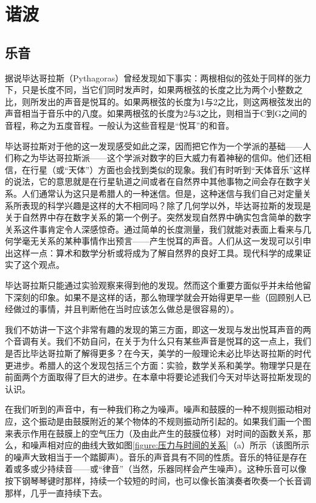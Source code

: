 \chapter{谐波}

\section{乐音}

据说毕达哥拉斯（Pythagoras）曾经发现如下事实：两根相似的弦处于同样的张力下，只是长度不同，当它们同时发声时，如果两根弦的长度之比为两个小整数之比，则所发出的声音是悦耳的。如果两根弦的长度为1与2之比，则这两根弦发出的声音相当于音乐中的八度。如果两根弦的长度为2与3之比，则相当于C到G之间的音程，称之为五度音程。一般认为这些音程是“悦耳”的和音。

毕达哥拉斯对于他的这一发现感受如此之深，因而把它作为一个学派的基础——人们称之为毕达哥拉斯派——这个学派对数字的巨大威力有着神秘的信仰。他们还相信，在行星（或“天体”）方面也会找到类似的现象。我们有时听到“天体音乐”这样的说法，它的意思就是在行星轨道之间或者在自然界中其他事物之间会存在数字关系。人们通常认为这只是希腊人的一种迷信。但是，这种迷信与我们自己对定量关系所表现的科学兴趣是这样的大不相同吗？除了几何学以外，毕达哥拉斯的发现是关于自然界中存在数字关系的第一个例子。突然发现自然界中确实包含简单的数字关系这件事肯定令人深感惊奇。通过简单的长度测量，我们就能对表面上看来与几何学毫无关系的某种事情作出预言——产生悦耳的声音。人们从这一发现可以引申出这样一点：算术和数学分析或将成为了解自然界的良好工具。现代科学的成果证实了这个观点。

毕达哥拉斯只能通过实验观察来得到他的发现。然而这个重要方面似乎并未给他留下深刻的印象。如果不是这样的话，那么物理学就会开始得更早一些（回顾别人已经做过的事情，并且判断他在当时应该怎么做总是很容易的）。

我们不妨讲一下这个非常有趣的发现的第三方面，即这一发现与发出悦耳声音的两个音调有关。我们不妨自问，在关于为什么只有某些声音是悦耳的这一点上，我们是否比毕达哥拉斯了解得更多？在今天，美学的一般理论未必比毕达哥拉斯的时代更进步。希腊人的这个发现包括三个方面：实验，数学关系和美学。物理学只是在前面两个方面取得了巨大的进步。在本章中将要论述我们今天对毕达哥拉斯发现的认识。

在我们听到的声音中，有一种我们称之为噪声。噪声和鼓膜的一种不规则振动相对应，这个振动是由鼓膜附近的某个物体的不规则振动所引起的。如果我们画一个图来表示作用在鼓膜上的空气压力（及由此产生的鼓膜位移）对时间的函数关系，那么，和噪声相对应的曲线大致如图\ref{figure:压力与时间的关系}（a）所示（该图所示的噪声大致相当于一个踏脚声）。音乐的声音具有不同的性质。音乐的特征是存在着或多或少持续音——或“律音”（当然，乐器同样会产生噪声）。这种乐音可以像按下钢琴琴键时那样，持续一个较短的时间，也可以像长笛演奏者吹奏一个长音调那样，几乎一直持续下去。

